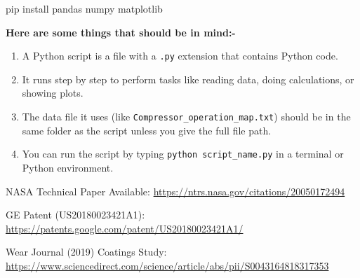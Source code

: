\documentclass[12pt,a4paper]{article}
\begin{document}
                pip install pandas numpy matplotlib
                
\textbf{Here are some things that should be in mind:-}
\begin{enumerate}
    \item A Python script is a file with a \texttt{.py} extension that contains Python code.

    \item It runs step by step to perform tasks like reading data, doing calculations, or showing plots.

    \item The data file it uses (like \texttt{Compressor\_operation\_map.txt}) should be in the same folder as the script unless you give the full file path.

    \item You can run the script by typing \texttt{python script\_name.py} in a terminal or Python environment.
\end{enumerate}

\begin{thebibliography}{9}

NASA Technical Paper Available: \url{https://ntrs.nasa.gov/citations/20050172494}

GE Patent (US20180023421A1):
\url{https://patents.google.com/patent/US20180023421A1/}

Wear Journal (2019) Coatings Study: \url{https://www.sciencedirect.com/science/article/abs/pii/S0043164818317353}
\end{thebibliography}
\end{document}
